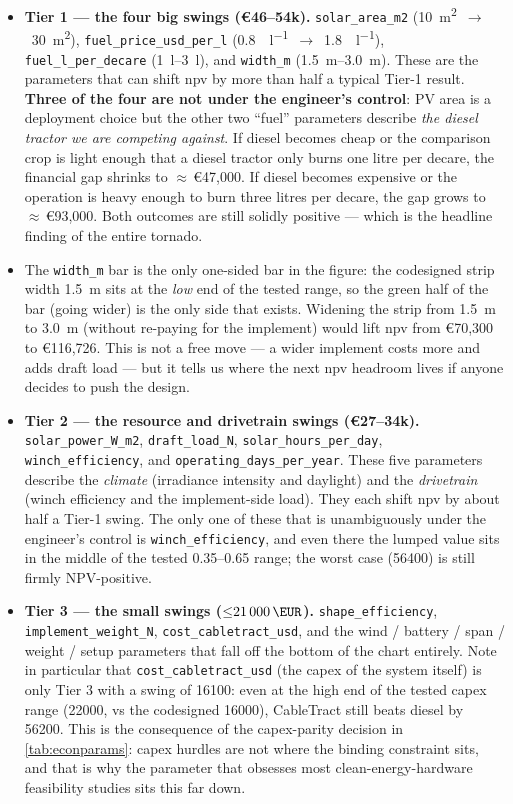 \documentclass[11pt,a4paper]{article}
\begin{document}
\begin{itemize}[leftmargin=1.6em,itemsep=0.2em]
    \item \textbf{Tier 1 --- the four big swings (€46--54k).} \texttt{solar\_area\_m2} (\SI{10}{\meter\squared}~$\to$~\SI{30}{\meter\squared}), \texttt{fuel\_price\_usd\_per\_l} (\SI{0.8}{\EUR\per\litre}~$\to$~\SI{1.8}{\EUR\per\litre}), \texttt{fuel\_l\_per\_decare} (\SIrange{1}{3}{\litre}), and \texttt{width\_m} (\SIrange{1.5}{3.0}{\meter}). These are the parameters that can shift \gls{npv} by more than half a typical Tier-1 result. \textbf{Three of the four are not under the engineer's control}: PV area is a deployment choice but the other two ``fuel'' parameters describe \emph{the diesel tractor we are competing against}. If diesel becomes cheap or the comparison crop is light enough that a diesel tractor only burns one litre per decare, the financial gap shrinks to ${\approx}\,$€47,000. If diesel becomes expensive or the operation is heavy enough to burn three litres per decare, the gap grows to ${\approx}\,$€93,000. Both outcomes are still solidly positive --- which is the headline finding of the entire tornado.
    \item The \texttt{width\_m} bar is the only one-sided bar in the figure: the codesigned strip width \SI{1.5}{\meter} sits at the \emph{low} end of the tested range, so the green half of the bar (going wider) is the only side that exists. Widening the strip from \SI{1.5}{\meter} to \SI{3.0}{\meter} (without re-paying for the implement) would lift \gls{npv} from €70,300 to €116,726. This is not a free move --- a wider implement costs more and adds draft load --- but it tells us where the next \gls{npv} headroom lives if anyone decides to push the design.
    \item \textbf{Tier 2 --- the resource and drivetrain swings (€27--34k).} \texttt{solar\_power\_W\_m2}, \texttt{draft\_load\_N}, \texttt{solar\_hours\_per\_day}, \texttt{winch\_efficiency}, and \texttt{operating\_days\_per\_year}. These five parameters describe the \emph{climate} (irradiance intensity and daylight) and the \emph{drivetrain} (winch efficiency and the implement-side load). They each shift \gls{npv} by about half a Tier-1 swing. The only one of these that is unambiguously under the engineer's control is \texttt{winch\_efficiency}, and even there the lumped value sits in the middle of the tested 0.35--0.65 range; the worst case (\SI{56400}{\EUR}) is still firmly NPV-positive.
    \item \textbf{Tier 3 --- the small swings (${\leq}\SI{21000}{\EUR}$).} \texttt{shape\_efficiency}, \texttt{implement\_weight\_N}, \texttt{cost\_cabletract\_usd}, and the wind / battery / span / weight / setup parameters that fall off the bottom of the chart entirely. Note in particular that \texttt{cost\_cabletract\_usd} (the \gls{capex} of the system itself) is only Tier 3 with a swing of \SI{16100}{\EUR}: even at the high end of the tested capex range (\SI{22000}{\EUR}, vs the codesigned \SI{16000}{\EUR}), CableTract still beats diesel by \SI{56200}{\EUR}. This is the consequence of the capex-parity decision in \cref{tab:econparams}: capex hurdles are not where the binding constraint sits, and that is why the parameter that obsesses most clean-energy-hardware feasibility studies sits this far down.

\end{itemize}
\end{document}
